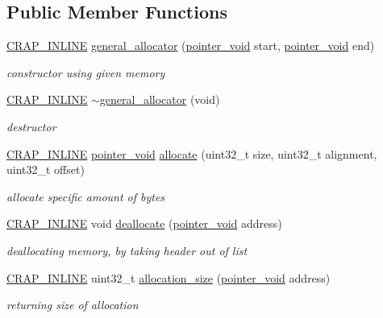 \subsection*{Public Member Functions}
\begin{DoxyCompactItemize}
\item 
\hyperlink{config__x86_8h_a5a40526b8d842e7ff731509998bb0f1c}{C\+R\+A\+P\+\_\+\+I\+N\+L\+I\+N\+E} \hyperlink{classcrap_1_1general__allocator_acc43eae69b77e105c2b9955d8f79a260}{general\+\_\+allocator} (\hyperlink{classcrap_1_1general__allocator_adc45630f82d3467f4a968e412cac88fc}{pointer\+\_\+void} start, \hyperlink{classcrap_1_1general__allocator_adc45630f82d3467f4a968e412cac88fc}{pointer\+\_\+void} end)
\begin{DoxyCompactList}\small\item\em constructor using given memory \end{DoxyCompactList}\item 
\hyperlink{config__x86_8h_a5a40526b8d842e7ff731509998bb0f1c}{C\+R\+A\+P\+\_\+\+I\+N\+L\+I\+N\+E} \hyperlink{classcrap_1_1general__allocator_a21e65b201415e41740abfb6f4f246abf}{$\sim$general\+\_\+allocator} (void)
\begin{DoxyCompactList}\small\item\em destructor \end{DoxyCompactList}\item 
\hyperlink{config__x86_8h_a5a40526b8d842e7ff731509998bb0f1c}{C\+R\+A\+P\+\_\+\+I\+N\+L\+I\+N\+E} \hyperlink{classcrap_1_1general__allocator_adc45630f82d3467f4a968e412cac88fc}{pointer\+\_\+void} \hyperlink{classcrap_1_1general__allocator_a905cb869f9107b72ac8f0f8f4221dc20}{allocate} (uint32\+\_\+t size, uint32\+\_\+t alignment, uint32\+\_\+t offset)
\begin{DoxyCompactList}\small\item\em allocate specific amount of bytes \end{DoxyCompactList}\item 
\hyperlink{config__x86_8h_a5a40526b8d842e7ff731509998bb0f1c}{C\+R\+A\+P\+\_\+\+I\+N\+L\+I\+N\+E} void \hyperlink{classcrap_1_1general__allocator_a118dce5448b6c6c38089e757ff4d181a}{deallocate} (\hyperlink{classcrap_1_1general__allocator_adc45630f82d3467f4a968e412cac88fc}{pointer\+\_\+void} address)
\begin{DoxyCompactList}\small\item\em deallocating memory, by taking header out of list \end{DoxyCompactList}\item 
\hyperlink{config__x86_8h_a5a40526b8d842e7ff731509998bb0f1c}{C\+R\+A\+P\+\_\+\+I\+N\+L\+I\+N\+E} uint32\+\_\+t \hyperlink{classcrap_1_1general__allocator_a0e323489710f40753c1c9d134edb2706}{allocation\+\_\+size} (\hyperlink{classcrap_1_1general__allocator_adc45630f82d3467f4a968e412cac88fc}{pointer\+\_\+void} address)
\begin{DoxyCompactList}\small\item\em returning size of allocation \end{DoxyCompactList}\end{DoxyCompactItemize}



